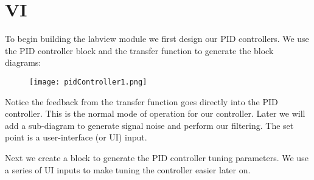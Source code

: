 \documentclass[main.tex]{subfile}
\begin{document}
\section{\Labview VI} 
\label{sec:labview_vi}

To begin building the labview module we first design our PID controllers. We use
the PID controller block and the transfer function to generate the block
diagrams:

\begin{figure}[H]
	\begin{center}
		\texttt{[image: pidController1.png]}
	\end{center}
	\caption{}
	\label{fig:}
\end{figure}

Notice the feedback from the transfer function goes directly into the PID
controller. This is the normal mode of operation for our controller. Later we
will add a sub-diagram to generate signal noise and perform our filtering. The
set point is a user-interface (or UI) input.

Next we create a block to generate the PID controller tuning parameters. We use
a series of UI inputs to make tuning the controller easier later on.


\end{document}
